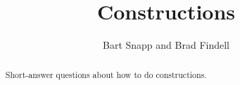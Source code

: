 \documentclass[nooutcomes]{ximera}
\title{Constructions}
\author{Bart Snapp and Brad Findell}
\begin{document}
\begin{abstract}
Short-answer questions about how to do constructions. 
\end{abstract}
\maketitle

%
\end{document}
